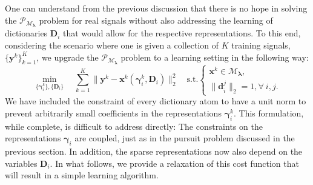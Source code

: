 \documentclass[10pt,journal]{IEEEtran}
\def\x{{\mathbf x}}
\def\d{{\mathbf d}}
\def\y{{\mathbf y}}
\def\D{{\mathbf D}}
\def\M{{\mathcal{M}}}
\def\P{{\mathcal{P}}}
\def\gama{{\boldsymbol \gamma}}
\def\lamda{{\boldsymbol \lambda}}
\def\PM{{\P_{\M_\lamda}}}
\theoremstyle{plain}
\theoremstyle{definition}
\begin{document}
One can understand from the previous discussion that there is no hope in solving the $\PM$ problem for real signals without also addressing the learning of dictionaries $\D_i$ that would allow for the respective representations. To this end, considering the scenario where one is given a collection of $K$ training signals, $\{\y^k\}_{k=1}^K$, we upgrade the $\PM$ problem to a learning setting in the following way:
\begin{equation}
	\min_{ \{\gama^k_i\},\{\D_i\}} \quad \sum_{k=1}^K \| \y^k - \x^k(\gama^k_i,\D_i) \|^2_2 \quad \text{s.t.} \left\{
	\begin{array}{c}
		\x^k \in\mathcal{M}_\lamda, \\
		\|\d^j_i\|_2 = 1, \forall \ i,j.
	\end{array}
\right.		
\label{Eq:FirstLearningProblemm}
\end{equation}
We have included the constraint of every dictionary atom to have a unit norm to prevent arbitrarily small coefficients in the representations $\gama_i^k$. This formulation, while complete, is difficult to address directly: The constraints on the representations $\gama_i$ are coupled, just as in the pursuit problem discussed in the previous section. In addition, the sparse representations now also depend on the variables $\D_i$. In what follows, we provide a relaxation of this cost function that will result in a simple learning algorithm.
\end{document}
